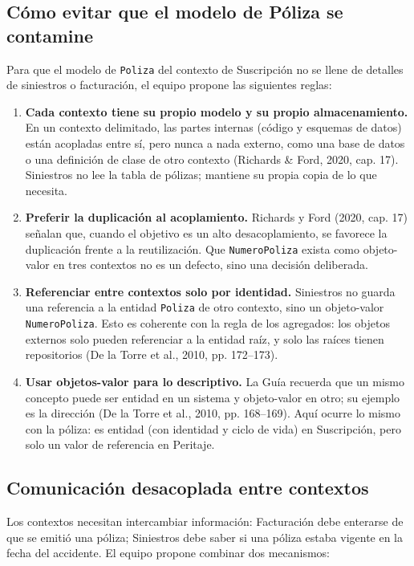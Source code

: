 \documentclass[11pt,a4paper]{article}
\begin{document}
\subsection{Cómo evitar que el modelo de Póliza se contamine}

Para que el modelo de \texttt{Poliza} del contexto de Suscripción no se llene de detalles de siniestros o facturación, el equipo propone las siguientes reglas:

\begin{enumerate}[leftmargin=1.5em]
  \item \textbf{Cada contexto tiene su propio modelo y su propio almacenamiento.} En un contexto delimitado, las partes internas (código y esquemas de datos) están acopladas entre sí, pero nunca a nada externo, como una base de datos o una definición de clase de otro contexto (Richards \& Ford, 2020, cap. 17). Siniestros no lee la tabla de pólizas; mantiene su propia copia de lo que necesita.
  \item \textbf{Preferir la duplicación al acoplamiento.} Richards y Ford (2020, cap. 17) señalan que, cuando el objetivo es un alto desacoplamiento, se favorece la duplicación frente a la reutilización. Que \texttt{NumeroPoliza} exista como objeto-valor en tres contextos no es un defecto, sino una decisión deliberada.
  \item \textbf{Referenciar entre contextos solo por identidad.} Siniestros no guarda una referencia a la entidad \texttt{Poliza} de otro contexto, sino un objeto-valor \texttt{NumeroPoliza}. Esto es coherente con la regla de los agregados: los objetos externos solo pueden referenciar a la entidad raíz, y solo las raíces tienen repositorios (De la Torre et al., 2010, pp. 172--173).
  \item \textbf{Usar objetos-valor para lo descriptivo.} La Guía recuerda que un mismo concepto puede ser entidad en un sistema y objeto-valor en otro; su ejemplo es la dirección (De la Torre et al., 2010, pp. 168--169). Aquí ocurre lo mismo con la póliza: es entidad (con identidad y ciclo de vida) en Suscripción, pero solo un valor de referencia en Peritaje.
\end{enumerate}

\subsection{Comunicación desacoplada entre contextos}

Los contextos necesitan intercambiar información: Facturación debe enterarse de que se emitió una póliza; Siniestros debe saber si una póliza estaba vigente en la fecha del accidente. El equipo propone combinar dos mecanismos:
\end{document}
